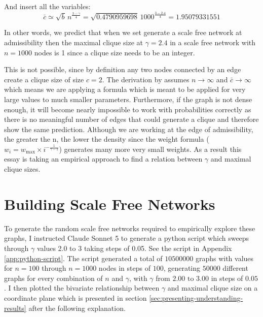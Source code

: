 \documentclass[12pt, a4paper]{article}   %
\begin{document}
And insert all the variables:
\[
    \bar{c} \simeq \sqrt{b}\, n^{\frac{3-\gamma}{4}} = \sqrt{0.4790959698}\, 1000^{\frac{3-2.4}{4}} = 1.95079331551
\]

In other words, we predict that when we set generate a scale free network at admissibility then the maximal clique size at \( \gamma = 2.4 \) in a scale free network with \( n = \num{1000} \) nodes is 1 since a clique size needs to be an integer. 

This is not possible, since by definition any two nodes connected by an edge create a clique size of size \(c=2\). The derivation by \textcite{bianconiNumberCliquesRandom2006} assumes \(n \to \infty\) and \(\bar{c} \to \infty\) which means we are applying a formula which is meant to be applied for very large values to much smaller parameters.
Furthermore, if the graph is not dense enough, it will become nearly impossible to work with probabilities correctly as there is no meaningful number of edges that could generate a clique and therefore show the same prediction. Although we are working at the edge of admissibility, the greater the n, the lower the density since the weight formula (\( w_i = w_{\text{max}} \times i^{ -\frac{1}{\gamma-1}}\)) generates many more very small weights. 
As a result this essay is taking an empirical approach to find a relation between \( \gamma \) and maximal clique sizes.

\section{Building Scale Free Networks}


To generate the random scale free networks required to empirically explore these graphs, I instructed Claude Sonnet 5 to generate a python script which sweeps through \( \gamma \) values 2.0 to 3 taking steps of 0.05. See the script in Appendix \ref{app:python-script}. The script generated a total of \(\num{10500000}\) graphs with values for \( n =100\) through \( n =1000\) nodes in steps of \(\num{100}\), generating \(\num{50000}\) different graphs for every combination of \( n \) and \( \gamma \), with \( \gamma \) from \(2.00 \text{ to } 3.00\) in steps of \(0.05 \). I then plotted the bivariate relationship between \( \gamma \) and maximal clique size on a coordinate plane which is presented in section \ref{sec:presenting-understanding-results} after the following explanation. 
\end{document}
